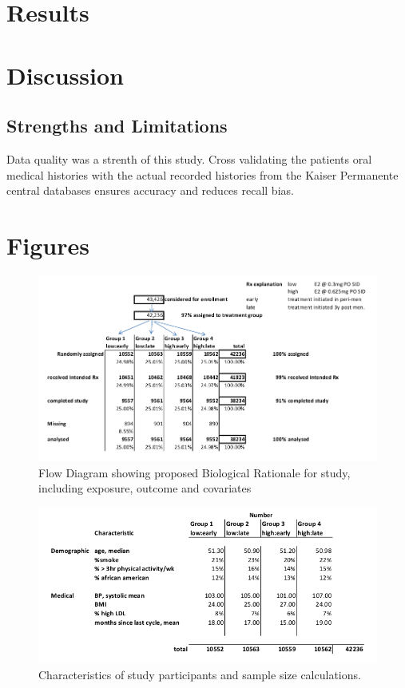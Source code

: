\documentclass[12pt]{article}
\begin{document}
	\section{Results}


	\section{Discussion} 


	\subsection{Strengths and Limitations}
		Data quality was a strenth of this study.
		Cross validating the patients oral medical histories with the actual recorded histories from the Kaiser Permanente central databases ensures accuracy and reduces recall bias.
		
	\section{Figures}

\begin{figure}[h!]
	\centering
	\includegraphics[scale=0.3]{figure1.jpg}
	\caption{Flow Diagram showing proposed Biological Rationale for study, including exposure, outcome and covariates }
	\label{figure1}
\end{figure}

\begin{figure}[h!]
	\centering
	\includegraphics[scale=0.5]{table1.jpg}
	\caption{Characteristics of study participants and sample size calculations.}
	\label{table1}
\end{figure}
 
\end{document}
